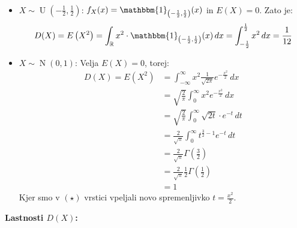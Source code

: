 \documentclass[12pt]{book}
\def\n{\noindent}
\theoremstyle{definition}
\theoremstyle{plain}
\theoremstyle{plain}
\theoremstyle{plain}
\theoremstyle{remark}
\begin{document}
\begin{zgled}
    ~

    \begin{itemize}
        \item $X \sim \operatorname{U}\left(-\frac{1}{2}, \frac{1}{2}\right)$: $f_X(x)=\mathbbm{1}_{\left(-\frac{1}{2}, \frac{1}{2}\right)}(x)$ in $E(X)=0$. Zato je: 
        $$
        D(X)=E\left(X^2\right)=\int_{\mathbb{R}} x^2 \cdot \mathbbm{1}_{\left(-\frac{1}{2}, \frac{1}{2}\right)}(x) \, d x =\int_{-\frac{1}{2}}^{\frac{1}{2}} x^2 \, d x=\frac{1}{12}
        $$
        \item $X \sim \operatorname{N}(0,1)$: Velja $E(X)=0$, torej: 
        \begin{align*}
            D(X)=E\left(X^2\right)&=\int_{-\infty}^{\infty} x^2 \frac{1}{\sqrt{2 \pi}}  e^{-\frac{x^2}{2}} \, d x \\
            &=\sqrt{\frac{2}{\pi}} \int_0^{\infty} x^2 e^{-\frac{x^2}{2}} \, d x \tag{$\star$}\\ 
            &=\sqrt{\frac{2}{\pi}} \int_0^{\infty} \sqrt{2 t} \cdot e^{-t} \,d t \\
            &=\frac{2}{\sqrt{\pi}} \int_0^{\infty} t^{\frac{3}{2}-1} e^{-t} \, d t \\
            &=\frac{2}{\sqrt{\pi}} \Gamma\left(\frac{3}{2}\right) \\
            &=\frac{2}{\sqrt{\pi}} \frac{1}{2} \Gamma\left(\frac{1}{2}\right) \\
            &=1
        \end{align*}
        Kjer smo v $(\star)$ vrstici vpeljali novo spremenljivko $t=\frac{x^2}{2}$.
    \end{itemize}
\end{zgled}

\n \textbf{Lastnosti $D(X)$:}
\end{document}

